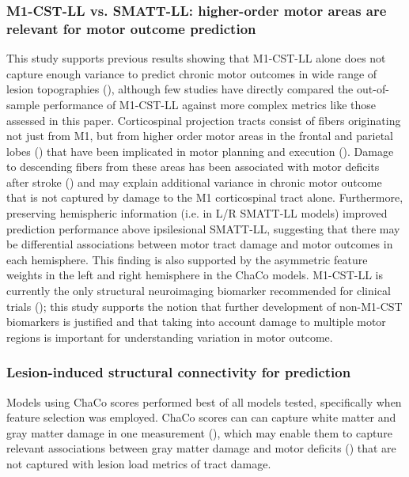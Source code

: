\documentclass[10pt]{article}
\begin{document}
\subsubsection*{M1-CST-LL vs. SMATT-LL: higher-order motor areas are relevant for motor outcome prediction}
This study supports previous results showing that M1-CST-LL alone does not capture enough variance to predict chronic motor outcomes in wide range of lesion topographies (\cite{Rondina2017-ij, Park2016-te, Ito2022-em}), although few studies have directly compared the out-of-sample performance of M1-CST-LL against more complex metrics like those assessed in this paper. Corticospinal projection tracts consist of fibers originating not just from M1, but from higher order motor areas in the frontal and parietal lobes (\cite{Galea1994-yi}) that have been implicated in motor planning and execution (\cite{Ball1999-yo}). Damage to descending fibers from these areas has been associated with motor deficits after stroke (\cite{Ito2022-em, Riley2011-xo}) and may explain additional variance in chronic motor outcome that is not captured by damage to the M1 corticospinal tract alone. Furthermore, preserving hemispheric information (i.e. in L/R SMATT-LL models) improved prediction performance above ipsilesional SMATT-LL, suggesting that there may be differential associations between motor tract damage and motor outcomes in each hemisphere.  This finding is also supported by the asymmetric feature weights in the left and right hemisphere in the ChaCo models. M1-CST-LL is currently the only structural neuroimaging biomarker recommended for clinical trials (\cite{Boyd2017-gs}); this study supports the notion that further development of non-M1-CST biomarkers is justified and that taking into account damage to multiple motor regions is important for understanding variation in motor outcome.

\subsubsection*{Lesion-induced structural connectivity for prediction}

Models using ChaCo scores performed best of all models tested, specifically when feature selection was employed. ChaCo scores can can capture white matter and gray matter damage in one measurement (\cite{Kuceyeski2013-nk}), which may enable them to capture relevant associations between gray matter damage and motor deficits (\cite{Park2016-te,Rondina2016-ds}) that are not captured with lesion load metrics of tract damage. 
\end{document}
